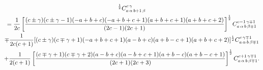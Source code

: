 \begin{multline}
  [(b\pm\beta)(b\pm\beta+1)]^{\frac{1}{2}}\clebsch{a}{\alpha}{b+1}{\beta}{c}{\gamma}\\
=\frac{1}{2 c}\left[\frac{(c \pm \gamma)(c \pm \gamma-1)(-a+b+c)(-a+b+c+1)(a+b+c+1)(a+b+c+2)}{(2 c-1)(2 c+1)}\right]^{\frac{1}{2}} \clebsch{a}{\alpha}{b}{\beta \mp 1}{c-1}{\gamma \mp 1} \\
\mp \frac{1}{2 c(c+1)}[(c \pm \gamma)(c \mp \gamma+1)(-a+b+c+1)(a-b+c)(a+b-c+1)(a+b+c+2)]^{\frac{1}{2}} \clebsch{a}{\alpha}{b}{\beta \mp 1}{c}{\gamma \mp 1}  \\
+\frac{1}{2(c+1)}\left[\frac{(c \mp \gamma+1)(c \mp \gamma+2)(a-b+c)(a-b+c+1)(a+b-c)(a+b-c+1)}{(2 c+1)(2 c+3)}\right]^{\frac{1}{2}} \clebsch{a}{\alpha}{b}{\beta \mp 1}{c+1}{\gamma \mp 1} .  \label{eq:8:6:34}
\end{multline}
